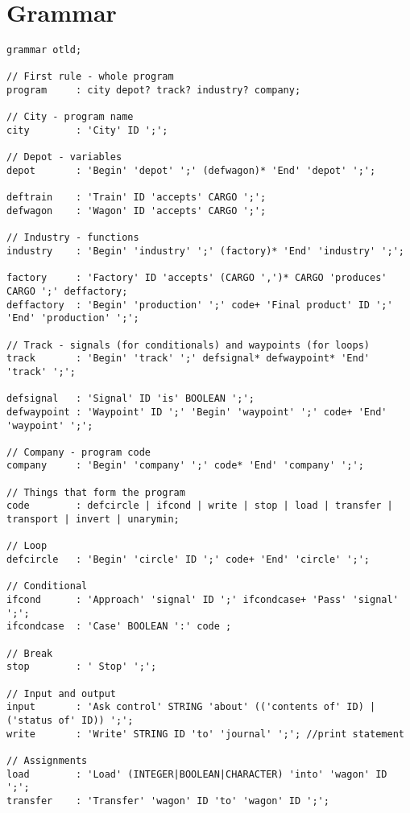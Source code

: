 \chapter{Grammar}

\begin{landscape}
\begin{lstlisting}[style=Antlr]
grammar otld;

// First rule - whole program
program     : city depot? track? industry? company;

// City - program name
city        : 'City' ID ';';

// Depot - variables
depot       : 'Begin' 'depot' ';' (defwagon)* 'End' 'depot' ';';

deftrain    : 'Train' ID 'accepts' CARGO ';';
defwagon    : 'Wagon' ID 'accepts' CARGO ';';

// Industry - functions
industry    : 'Begin' 'industry' ';' (factory)* 'End' 'industry' ';';

factory     : 'Factory' ID 'accepts' (CARGO ',')* CARGO 'produces' CARGO ';' deffactory;
deffactory  : 'Begin' 'production' ';' code+ 'Final product' ID ';' 'End' 'production' ';';

// Track - signals (for conditionals) and waypoints (for loops)
track       : 'Begin' 'track' ';' defsignal* defwaypoint* 'End' 'track' ';';

defsignal   : 'Signal' ID 'is' BOOLEAN ';';
defwaypoint : 'Waypoint' ID ';' 'Begin' 'waypoint' ';' code+ 'End' 'waypoint' ';';

// Company - program code
company     : 'Begin' 'company' ';' code* 'End' 'company' ';';

// Things that form the program
code        : defcircle | ifcond | write | stop | load | transfer | transport | invert | unarymin;

// Loop
defcircle   : 'Begin' 'circle' ID ';' code+ 'End' 'circle' ';';

// Conditional
ifcond      : 'Approach' 'signal' ID ';' ifcondcase+ 'Pass' 'signal' ';';
ifcondcase  : 'Case' BOOLEAN ':' code ;

// Break
stop        : ' Stop' ';';

// Input and output
input       : 'Ask control' STRING 'about' (('contents of' ID) | ('status of' ID)) ';';
write       : 'Write' STRING ID 'to' 'journal' ';'; //print statement

// Assignments
load        : 'Load' (INTEGER|BOOLEAN|CHARACTER) 'into' 'wagon' ID ';';
transfer    : 'Transfer' 'wagon' ID 'to' 'wagon' ID ';';


\end{lstlisting}
\end{landscape}
